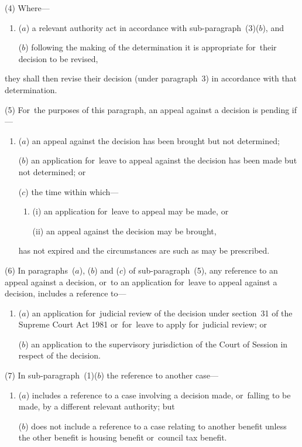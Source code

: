 \documentclass[12pt,a4paper]{article}
\begin{document}
(4) Where—
\begin{enumerate}\item[]
($a$) a relevant authority act in accordance with sub-paragraph~(3)($b$), and

($b$) following the making of the determination it is appropriate for~their decision to be revised,
\end{enumerate}
they shall then revise their decision (under paragraph~3) in accordance with that determination.

(5) For~the purposes of this paragraph, an appeal against a decision is pending if—
\begin{enumerate}\item[]
($a$) an appeal against the decision has been brought but not determined;

($b$) an application for~leave to appeal against the decision has been made but not determined; or

($c$) the time within which—
\begin{enumerate}\item[]
(i) an application for~leave to appeal may be made, or

(ii) an appeal against the decision may be brought,
\end{enumerate}
has not expired and the circumstances are such as may be prescribed.
\end{enumerate}

(6) In paragraphs~($a$), ($b$)  and ($c$)  of sub-paragraph~(5), any reference to an appeal against a decision, or~to an application for~leave to appeal against a decision, includes a reference to—
\begin{enumerate}\item[]
($a$) an application for~judicial review of the decision under section~31 of the Supreme Court Act 1981 or~for~leave to apply for~judicial review; or

($b$) an application to the supervisory jurisdiction of the Court of Session in respect of the decision.
\end{enumerate}

(7) In sub-paragraph~(1)($b$)  the reference to another case—
\begin{enumerate}\item[]
($a$) includes a reference to a case involving a decision made, or~falling to be made, by a different relevant authority; but

($b$) does not include a reference to a case relating to another benefit unless the other benefit is housing benefit or~council tax benefit.
\end{enumerate}
\end{document}
